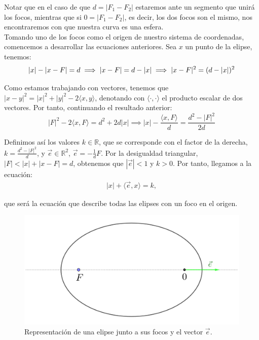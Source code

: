 \documentclass[11pt]{article}
\begin{document}
Notar que en el caso de que $d=|F_1-F_2|$ estaremos ante un segmento que unirá los focos, mientras que si $0=|F_1-F_2|$, es decir, los dos focos son el mismo, nos encontraremos con que nuestra curva es una esfera.\\

Tomando uno de los focos como el origen de nuestro sistema de coordenadas, comencemos a desarrollar las ecuaciones anteriores. Sea $x$ un punto de la elipse, tenemos:
\[
|x|-|x-F|=d \implies |x-F|=d-|x| \implies |x-F|^2=(d-|x|)^2\\
\]

Como estamos trabajando con vectores, tenemos que $|x-y|^2=|x|^2+|y|^2-2\langle x,y\rangle$, denotando con $\langle\cdot,\cdot\rangle$ el producto escalar de dos vectores. Por tanto, continuando el resultado anterior:
\[
|F|^2-2\langle x,F\rangle=d^2+2d|x| \implies |x|-\frac{\langle x,F\rangle}{d}=\frac{d^2-|F|^2}{2d}
\]

Definimos así los valores $k\in\mathbb{R}$, que se corresponde con el factor de la derecha, $k=\frac{d^2-|F|^2}{d}$, y $\vec{e}\in\mathbb{R}^2$, $\vec{e}=-\frac{1}{d}F$. Por la desigualdad triangular, $|F|<|x|+|x-F|=d$, obtenemos que $|\vec{e}|<1$ y $k>0$. Por tanto, llegamos a la ecuación:
\begin{align}
|x|+\langle \vec{e},x\rangle=k,
\label{eq:elipse_cartesiana}
\end{align}

\noindent que será la ecuación que describe todas las elipses con un foco en el origen.\\

\begin{figure}[H]
\centering
\includegraphics[scale=0.12]{images/elipse_excentricidad.png}
\caption{Representación de una elipse junto a sus focos y el vector $\vec{e}$.}
\label{fig:elipse_excentricidad}
\end{figure}
\end{document}
